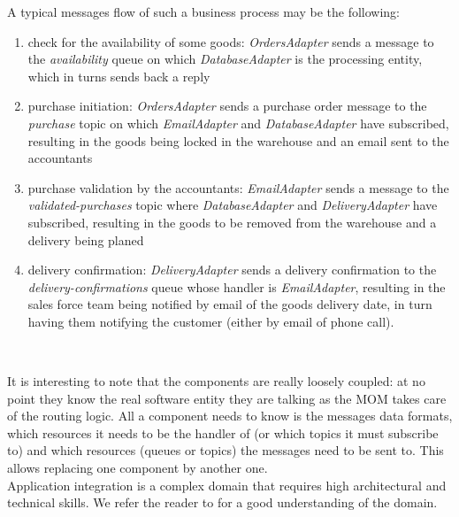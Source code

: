A typical messages flow of such a business process may be the following:
\begin{enumerate}
  
  \item check for the availability of some goods: \emph{OrdersAdapter} sends a message to the \emph{availability} queue on which \emph{DatabaseAdapter} is the processing entity, which in turns sends back a reply
  
  \item purchase initiation: \emph{OrdersAdapter} sends a purchase order message to the \emph{purchase} topic on which \emph{EmailAdapter} and \emph{DatabaseAdapter} have subscribed, resulting in the goods being locked in the warehouse and an email sent to the accountants
  
  \item purchase validation by the accountants: \emph{EmailAdapter} sends a message to the \emph{validated-purchases} topic where \emph{DatabaseAdapter} and \emph{DeliveryAdapter} have subscribed, resulting in the goods to be removed from the warehouse and a delivery being planed
  
  \item delivery confirmation: \emph{DeliveryAdapter} sends a delivery confirmation to the \emph{delivery-confirmations} queue whose handler is \emph{EmailAdapter}, resulting in the sales force team being notified by email of the goods delivery date, in turn having them notifying the customer (either by email of phone call).
  
\end{enumerate}\

It is interesting to note that the components are really loosely coupled: at no point they know the real software entity they are talking as the MOM takes care of the routing logic. All a component needs to know is the messages data formats, which resources it needs to be the handler of (or which topics it must subscribe to) and which resources (queues or topics) the messages need to be sent to. This allows replacing one component by another one. \\

Application integration is a complex domain that requires high architectural and technical skills. We refer the reader to \cite{EAA02} for a good understanding of the domain.\\


